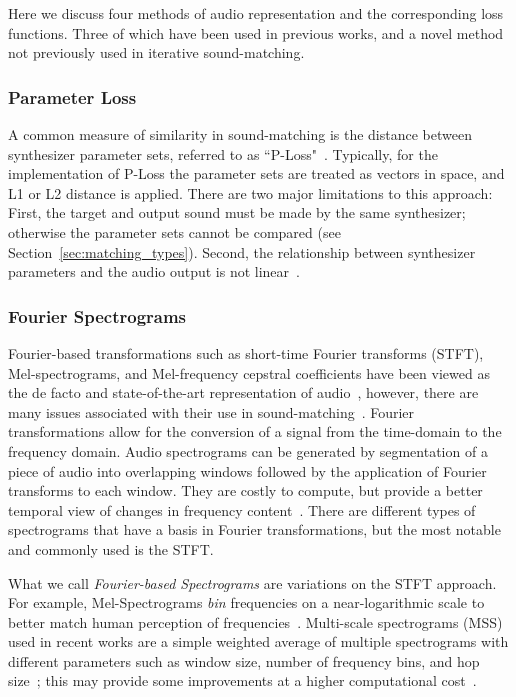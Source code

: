 \documentclass[lettersize,journal]{IEEEtran}
\providecommand{\gls}[1]{#1}
\begin{document}
Here we discuss four methods of audio representation and the corresponding loss functions. Three of which have been used in previous works, and a novel method not previously used in iterative sound-matching. 

\subsubsection{Parameter Loss}
A common measure of similarity in sound-matching is the distance between synthesizer parameter sets, referred to as ``P-Loss"~\cite{han2023perceptual}. Typically, for the implementation of P-Loss the parameter sets are treated as vectors in space, and L1 or L2 distance is applied. There are two major limitations to this approach: First, the target and output sound must be made by the same synthesizer; otherwise the parameter sets cannot be compared (see Section~\ref{sec:matching_types}). Second, the relationship between synthesizer parameters and the audio output is not linear~\cite{shier2020spiegelib,han2023perceptual,esling2019flow}. 

\subsubsection{Fourier Spectrograms}
\label{sec:fourier_specs}
Fourier-based transformations such as short-time Fourier transforms (\gls{STFT}), Mel-spectrograms, and Mel-frequency cepstral coefficients have been viewed as the de facto and state-of-the-art representation of audio~\cite{beauchamp2003error,mitchell2007evolutionary,yee2018automatic}, however, there are many issues associated with their use in sound-matching~\cite{turian2020sorry,vahidi2023mesostructures,han2023perceptual,uzrad2024diffmoog}. Fourier transformations allow for the conversion of a signal from the time-domain to the frequency domain. Audio spectrograms can be generated by segmentation of a piece of audio into overlapping windows followed by the application of Fourier transforms to each window. They are costly to compute, but provide a better temporal view of changes in frequency content~\cite{muller2007dynamic,smith2007mathematics}. There are different types of spectrograms that have a basis in Fourier transformations, but the most notable and commonly used is the STFT.  

What we call \textit{Fourier-based Spectrograms} are variations on the STFT approach. For example, Mel-Spectrograms \textit{bin} frequencies on a near-logarithmic scale to better match human perception of frequencies~\cite{muller2007dynamic}. Multi-scale spectrograms (\gls{MSS}) used in recent works are a simple weighted average of multiple spectrograms with different parameters such as window size, number of frequency bins, and hop size~\cite{engel2020ddsp,vahidi2023mesostructures}; this may provide some improvements at a higher computational cost~\cite{turian2020sorry,engel2020ddsp}.
\end{document}
